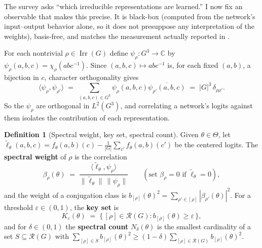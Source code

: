 \documentclass[11pt]{amsart}
\theoremstyle{plain}
\theoremstyle{definition}
\newtheorem{definition}[theorem]{Definition}
\DeclareMathOperator{\Irr}{Irr}
\newcommand{\C}{\mathbb{C}}
\newcommand{\Rcl}{\mathcal{R}}
\begin{document}
The survey asks ``which irreducible representations are learned.'' I now fix an observable that makes this precise. It is black-box (computed from the network's input--output behavior alone, so it does not presuppose any interpretation of the weights), basis-free, and matches the measurement actually reported in \cite{chughtai2023}.

For each nontrivial $\rho \in \Irr(G)$ define $\psi_\rho \colon G^3 \to \C$ by $\psi_\rho(a,b,c) = \chi_\rho(abc^{-1})$. Since $(a,b,c) \mapsto abc^{-1}$ is, for each fixed $(a,b)$, a bijection in $c$, character orthogonality gives
\[
   \langle \psi_\rho, \psi_{\rho'} \rangle
   \;=\; \sum_{(a,b,c) \in G^3} \psi_\rho(a,b,c) \overline{\psi_{\rho'}(a,b,c)}
   \;=\; |G|^3\, \delta_{\rho\rho'}.
\]
So the $\psi_\rho$ are orthogonal in $L^2(G^3)$, and correlating a network's logits against them isolates the contribution of each representation.

\begin{definition}[Spectral weight, key set, spectral count]\label{def:keyset}
Given $\theta \in \Theta$, let $\tilde\ell_\theta(a,b,c) = f_\theta(a,b)(c) - \frac{1}{|G|}\sum_{c'} f_\theta(a,b)(c')$ be the centered logits. The \textbf{spectral weight} of $\rho$ is the correlation
\[
   \beta_\rho(\theta) \;=\; \frac{\langle \tilde\ell_\theta, \psi_\rho \rangle}{\|\tilde\ell_\theta\|\,\|\psi_\rho\|}
   \qquad (\text{set } \beta_\rho = 0 \text{ if } \tilde\ell_\theta = 0),
\]
and the weight of a conjugation class is $b_{[\rho]}(\theta)^2 = \sum_{\rho' \in [\rho]} |\beta_{\rho'}(\theta)|^2$. For a threshold $\varepsilon \in (0,1)$, the \textbf{key set} is
\[
   K_\varepsilon(\theta) \;=\; \{\, [\rho] \in \Rcl(G) : b_{[\rho]}(\theta) \geq \varepsilon \,\},
\]
and for $\delta \in (0,1)$ the \textbf{spectral count} $N_\delta(\theta)$ is the smallest cardinality of a set $S \subseteq \Rcl(G)$ with $\sum_{[\rho] \in S} b_{[\rho]}(\theta)^2 \geq (1-\delta) \sum_{[\rho] \in \Rcl(G)} b_{[\rho]}(\theta)^2$.
\end{definition}
\end{document}
